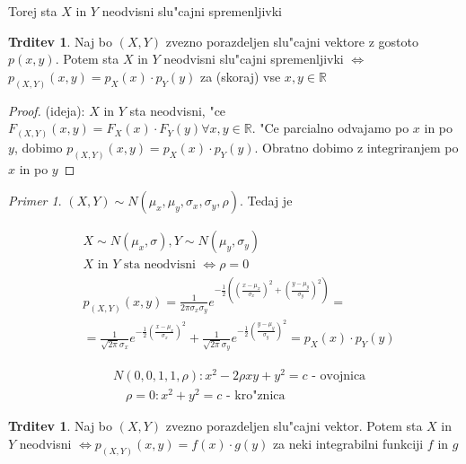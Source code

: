 \documentclass[a4paper,12pt]{article}
\theoremstyle{definition}
\newtheorem{claim}[counter]{Trditev}
\theoremstyle{remark}
\newtheorem*{ex}{Primer}
\newcommand{\R}{\mathbb{R}}
\begin{document}
Torej sta $X$ in $Y$ neodvisni slu"cajni spremenljivki

\begin{claim}
    Naj bo $(X,Y)$ zvezno porazdeljen slu"cajni vektore z gostoto $p(x,y)$. Potem sta $X$ in $Y$ neodvisni
    slu"cajni spremenljivki $\iff$ $p_{(X,Y)}(x,y) = p_X(x) \cdot p_Y(y)$ za (skoraj) vse $x,y \in \R$
\end{claim}

\begin{proof}
    (ideja): $X$ in $Y$ sta neodvisni, "ce $F_{(X,Y)}(x,y) = F_X(x) \cdot F_Y(y) \forall x, y \in \R$. "Ce parcialno
    odvajamo po $x$ in po $y$, dobimo $p_{(X,Y)}(x,y) = p_X(x) \cdot p_Y(y)$. Obratno dobimo z integriranjem po
    $x$ in po $y$
\end{proof}

\begin{ex}
    $(X,Y) \sim N(\mu_x, \mu_y, \sigma_x, \sigma_y, \rho)$. Tedaj je

    \begin{align*}
        &X \sim N(\mu_x, \sigma), Y \sim N(\mu_y, \sigma_y) \\
        &X \text{ in } Y \text{ sta neodvisni } \iff \rho = 0 \\
        &p_{(X,Y)}(x,y) = \frac{1}{2\pi \sigma_x \sigma_y} e^{-\frac{1}{2} ((\frac{x-\mu_x}{\sigma_x})^2 +
            (\frac{y-\mu_y}{\sigma_y})^2)} = \\
        &= \frac{1}{\sqrt{2\pi} \sigma_x} e^{-\frac{1}{2} (\frac{x-\mu_x}{\sigma_x})^2} +
            \frac{1}{\sqrt{2\pi} \sigma_y} e^{-\frac{1}{2} (\frac{y-\mu_y}{\sigma_y})^2} = p_X(x) \cdot p_Y(y)
    \end{align*}

    \begin{align*}
        &N(0,0,1,1,\rho): x^2 - 2\rho x y + y^2 = c \text{ - ovojnica} \\
        &\quad \rho = 0: x^2 + y^2 = c \text{ - kro"znica}
    \end{align*}
\end{ex}

\begin{claim}
    Naj bo $(X,Y)$ zvezno porazdeljen slu"cajni vektor. Potem sta $X$ in $Y$ neodvisni $\iff p_{(X,Y)}(x,y) =
    f(x) \cdot g(y)$ za neki integrabilni funkciji $f$ in $g$
\end{claim}
\end{document}
